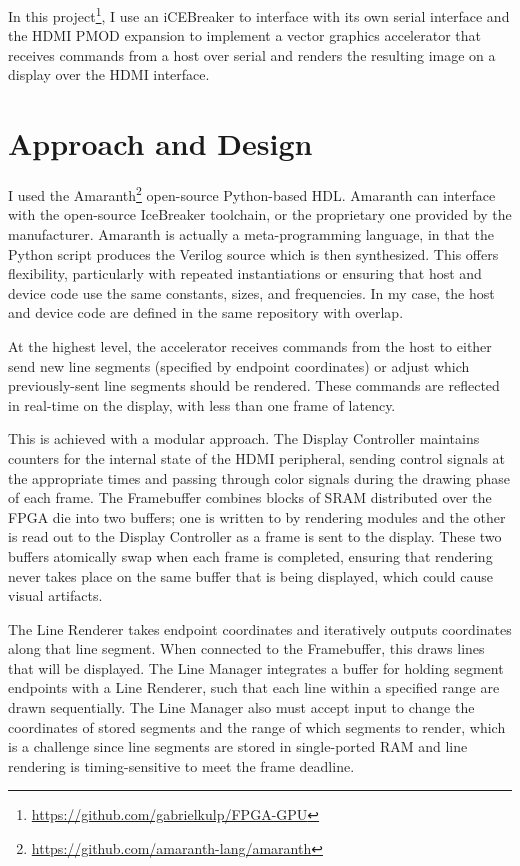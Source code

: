 \documentclass[11pt,conference]{IEEEtran}
\begin{document}
In this project\footnote{\url{https://github.com/gabrielkulp/FPGA-GPU}}, I use an iCEBreaker to interface with its own serial interface and the HDMI PMOD expansion to implement a vector graphics accelerator that receives commands from a host over serial and renders the resulting image on a display over the HDMI interface.


\section{Approach and Design}
I used the Amaranth\footnote{\url{https://github.com/amaranth-lang/amaranth}} open-source Python-based HDL.
Amaranth can interface with the open-source IceBreaker toolchain, or the proprietary one provided by the manufacturer.
Amaranth is actually a meta-programming language, in that the Python script produces the Verilog source which is then synthesized.
This offers flexibility, particularly with repeated instantiations or ensuring that host and device code use the same constants, sizes, and frequencies.
In my case, the host and device code are defined in the same repository with overlap.

At the highest level, the accelerator receives commands from the host to either send new line segments (specified by endpoint coordinates) or adjust which previously-sent line segments should be rendered.
These commands are reflected in real-time on the display, with less than one frame of latency.

This is achieved with a modular approach.
The Display Controller maintains counters for the internal state of the HDMI peripheral, sending control signals at the appropriate times and passing through color signals during the drawing phase of each frame.
The Framebuffer combines blocks of SRAM distributed over the FPGA die into two buffers; one is written to by rendering modules and the other is read out to the Display Controller as a frame is sent to the display.
These two buffers atomically swap when each frame is completed, ensuring that rendering never takes place on the same buffer that is being displayed, which could cause visual artifacts.

The Line Renderer takes endpoint coordinates and iteratively outputs coordinates along that line segment.
When connected to the Framebuffer, this draws lines that will be displayed.
The Line Manager integrates a buffer for holding segment endpoints with a Line Renderer, such that each line within a specified range are drawn sequentially.
The Line Manager also must accept input to change the coordinates of stored segments and the range of which segments to render, which is a challenge since line segments are stored in single-ported RAM and line rendering is timing-sensitive to meet the frame deadline.
\end{document}
